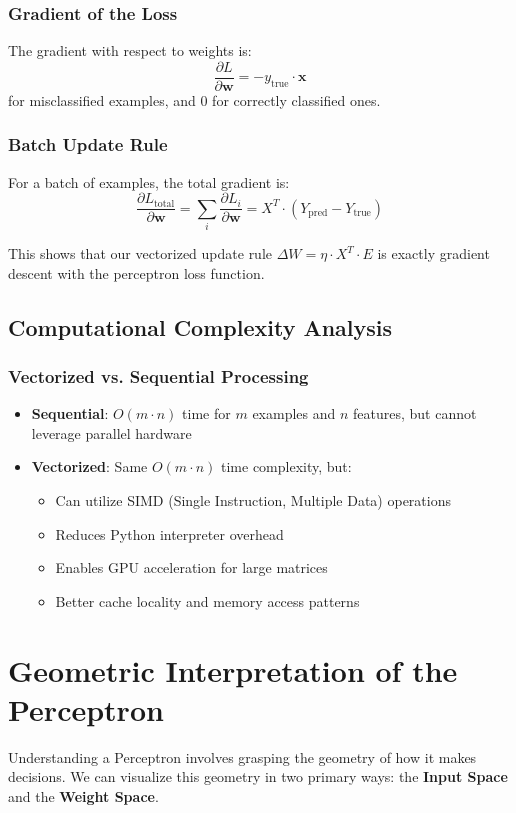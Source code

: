 \subsubsection{Gradient of the Loss}
The gradient with respect to weights is:
\[\frac{\partial L}{\partial \mathbf{w}} = -y_{\text{true}} \cdot \mathbf{x}\]
for misclassified examples, and 0 for correctly classified ones.

\subsubsection{Batch Update Rule}
For a batch of examples, the total gradient is:
\[\frac{\partial L_{\text{total}}}{\partial \mathbf{w}} = \sum_{i} \frac{\partial L_i}{\partial \mathbf{w}} = X^T \cdot (Y_{\text{pred}} - Y_{\text{true}})\]

This shows that our vectorized update rule \(\Delta W = \eta \cdot X^T \cdot E\) is exactly gradient descent with the perceptron loss function.

\subsection{Computational Complexity Analysis}
\subsubsection{Vectorized vs. Sequential Processing}
\begin{itemize}
    \item \textbf{Sequential}: \(O(m \cdot n)\) time for \(m\) examples and \(n\) features, but cannot leverage parallel hardware
    \item \textbf{Vectorized}: Same \(O(m \cdot n)\) time complexity, but:
    \begin{itemize}
        \item Can utilize SIMD (Single Instruction, Multiple Data) operations
        \item Reduces Python interpreter overhead
        \item Enables GPU acceleration for large matrices
        \item Better cache locality and memory access patterns
    \end{itemize}
\end{itemize}

\section{Geometric Interpretation of the Perceptron}
Understanding a Perceptron involves grasping the geometry of how it makes decisions. We can visualize this geometry in two primary ways: the \textbf{Input Space} and the \textbf{Weight Space}.

